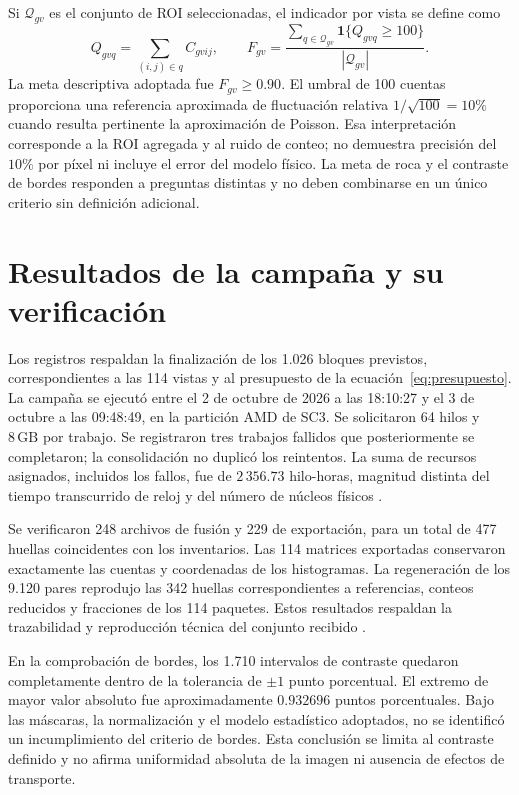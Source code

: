 \documentclass[11pt,a4paper]{article}
\newcommand{\ind}{\mathbf{1}}
\begin{document}
Si $\mathcal Q_{gv}$ es el conjunto de ROI seleccionadas, el indicador por vista se define como
\begin{equation}
 Q_{gvq}=\sum_{(i,j)\in q}C_{gvij},\qquad
 F_{gv}=\frac{\sum_{q\in\mathcal Q_{gv}}\ind\{Q_{gvq}\geq100\}}
 {|\mathcal Q_{gv}|}.
 \label{eq:roca}
\end{equation}
La meta descriptiva adoptada fue $F_{gv}\geq0.90$. El umbral de 100 cuentas proporciona una referencia aproximada de fluctuación relativa $1/\sqrt{100}=10\%$ cuando resulta pertinente la aproximación de Poisson. Esa interpretación corresponde a la ROI agregada y al ruido de conteo; no demuestra precisión del $10\%$ por píxel ni incluye el error del modelo físico. La meta de roca y el contraste de bordes responden a preguntas distintas y no deben combinarse en un único criterio sin definición adicional.

\section{Resultados de la campaña y su verificación}

Los registros respaldan la finalización de los 1.026 bloques previstos, correspondientes a las 114 vistas y al presupuesto de la ecuación~\eqref{eq:presupuesto}. La campaña se ejecutó entre el 2 de octubre de 2026 a las 18:10:27 y el 3 de octubre a las 09:48:49, en la partición AMD de SC3. Se solicitaron 64 hilos y $8\,\mathrm{GB}$ por trabajo. Se registraron tres trabajos fallidos que posteriormente se completaron; la consolidación no duplicó los reintentos. La suma de recursos asignados, incluidos los fallos, fue de $2\,356.73$ hilo-horas, magnitud distinta del tiempo transcurrido de reloj y del número de núcleos físicos \cite{campana}.

Se verificaron 248 archivos de fusión y 229 de exportación, para un total de 477 huellas coincidentes con los inventarios. Las 114 matrices exportadas conservaron exactamente las cuentas y coordenadas de los histogramas. La regeneración de los 9.120 pares reprodujo las 342 huellas correspondientes a referencias, conteos reducidos y fracciones de los 114 paquetes. Estos resultados respaldan la trazabilidad y reproducción técnica del conjunto recibido \cite{datos}.

En la comprobación de bordes, los 1.710 intervalos de contraste quedaron completamente dentro de la tolerancia de $\pm1$ punto porcentual. El extremo de mayor valor absoluto fue aproximadamente $0.932696$ puntos porcentuales. Bajo las máscaras, la normalización y el modelo estadístico adoptados, no se identificó un incumplimiento del criterio de bordes. Esta conclusión se limita al contraste definido y no afirma uniformidad absoluta de la imagen ni ausencia de efectos de transporte.
\end{document}
